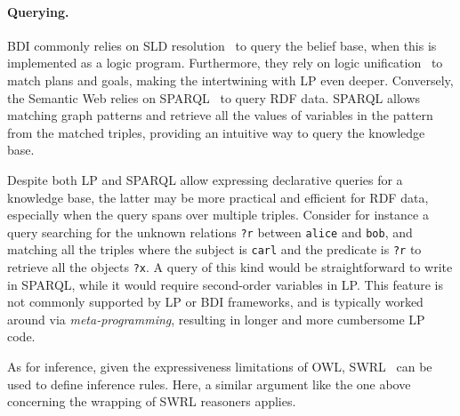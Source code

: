 
\paragraph{Querying.}

\ac{BDI} commonly relies on \ac{SLD} resolution~\cite{emden1976jacm} to query the belief base,
when this is implemented as a logic program.
%
Furthermore,
they rely on logic unification~\cite{10.1145/357162.357169} to match plans and goals,
making the intertwining with \ac{LP} even deeper.
%
%
Conversely,
the Semantic Web relies on \ac{SPARQL}~\cite{sparqlprotocol} to query \ac{RDF} data.
%
\ac{SPARQL} allows matching graph patterns and retrieve all the values of variables in the pattern from the matched triples,
providing an intuitive way to query the knowledge base.

Despite both \ac{LP} and \ac{SPARQL} allow expressing declarative queries for a knowledge base,
the latter may be more practical and efficient for \ac{RDF} data,
especially when the query spans over multiple triples.
%
Consider for instance a query searching for the unknown relations \texttt{?r} between \texttt{alice} and \texttt{bob},
and matching all the triples where the subject is \texttt{carl} and
the predicate is \texttt{?r} to retrieve all the objects \texttt{?x}.
%
A query of this kind would be straightforward to write in \acs{SPARQL}, 
while it would require second-order variables in \ac{LP}. 
%
This feature is not commonly supported by \ac{LP} or \ac{BDI} frameworks, 
and is typically worked around via \emph{meta-programming}, 
resulting in longer and more cumbersome \ac{LP} code.

%
As for inference,
given the expressiveness limitations of \ac{OWL},
\ac{SWRL}~\cite{horrocks2004swrl} can be used to define inference rules.
%
Here, a similar argument like the one above concerning the wrapping of \ac{SWRL} reasoners applies.

